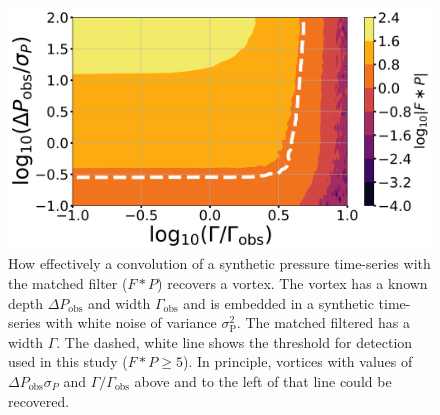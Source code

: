 \documentclass{aastex63}
\begin{document}
\begin{figure}
    \centering
    \includegraphics[width=\textwidth]{figures/vortex_recovery.png}
    \caption{How effectively a convolution of a synthetic pressure time-series with the matched filter ($F \ast P$) recovers a vortex. The vortex has a known depth $\Delta P_\text{obs}$ and width $\Gamma_\text{obs}$ and is embedded in a synthetic time-series with white noise of variance $\sigma_\text{P}^2$. The matched filtered has a width $\Gamma$. The dashed, white line shows the threshold for detection used in this study ($F \ast P \geq 5$). In principle, vortices with values of $\Delta P_\text{obs}\sigma_P$ and $\Gamma/\Gamma_\text{obs}$ above and to the left of that line could be recovered.}
    \label{fig:vortex_recovery}
\end{figure}


\end{document}
